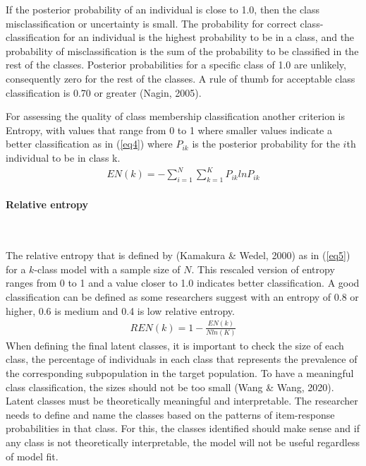 \documentclass[12pt,a4paper,oneside]{reedthesis}
\begin{document}
If the posterior probability of an individual is close to 1.0, then the class misclassification or uncertainty is small. The probability for correct class-classification for an individual is the highest probability to be in a class, and the probability of misclassification is the sum of the probability to be classified in the rest of the classes. Posterior probabilities for a specific class of 1.0 are unlikely, consequently zero for the rest of the classes. A rule of thumb for acceptable class classification is 0.70 or greater (Nagin, 2005).

For assessing the quality of class membership classification another criterion is Entropy, with values that range from 0 to 1 where smaller values indicate a better classification as in (\ref{eq4}) where \(P_{ik}\) is the posterior probability for the \(i\)th individual to be in class k.
\begin{align}
EN(k) = - \sum^N_{i=1} \sum^K_{k=1}P_{ik} ln P_{ik} \label{eq4}
\end{align}
\hypertarget{relative-entropy}{%
\paragraph{Relative entropy}\label{relative-entropy}}

~

The relative entropy that is defined by (Kamakura \& Wedel, 2000) as in (\ref{eq5}) for a \(k\)-class model with a sample size of \(N\). This rescaled version of entropy ranges from 0 to 1 and a value closer to 1.0 indicates better classification. A good classification can be defined as some researchers suggest with an entropy of 0.8 or higher, 0.6 is medium and 0.4 is low relative entropy.
\begin{align}
REN(k) = 1-\frac{EN(k)}{N ln(K)} \label{eq5}
\end{align}
When defining the final latent classes, it is important to check the size of each class, the percentage of individuals in each class that represents the prevalence of the corresponding subpopulation in the target population. To have a meaningful class classification, the sizes should not be too small (Wang \& Wang, 2020).
Latent classes must be theoretically meaningful and interpretable. The researcher needs to define and name the classes based on the patterns of item-response probabilities in that class. For this, the classes identified should make sense and if any class is not theoretically interpretable, the model will not be useful regardless of model fit.
\end{document}

